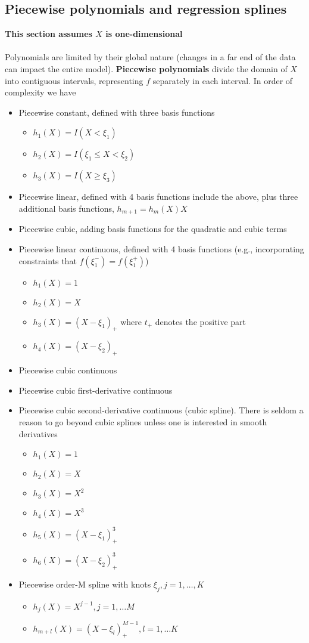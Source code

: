\documentclass{article}
\begin{document}
\subsection{Piecewise polynomials and regression splines}
\textbf{This section assumes $X$ is one-dimensional}\\\\
Polynomials are limited by their global nature (changes in a far end of the data can impact the entire model). \textbf{Piecewise polynomials} divide the domain of $X$ into contiguous intervals, representing $f$ separately in each interval. In order of complexity we have
\begin{itemize}
  \item Piecewise constant, defined with three basis functions
  \begin{itemize}
    \item $h_1(X) = I(X < \xi_1)$
    \item $h_2(X) = I(\xi_1 \leq X < \xi_2)$
    \item $h_3(X) = I(X \geq \xi_3)$
  \end{itemize}
  \item Piecewise linear, defined with 4 basis functions include the above, plus three additional basis functions, $h_{m+1} = h_m(X)X$
  \item Piecewise cubic, adding basis functions for the quadratic and cubic terms
  \item Piecewise linear continuous, defined with 4 basis functions (e.g., incorporating constraints that $f(\xi_1^-) = f(\xi_1^+)$)
  \begin{itemize}
    \item $h_1(X) = 1$
    \item $h_2(X) = X$
    \item $h_3(X) = (X - \xi_1)_+$ where $t_+$ denotes the positive part
    \item $h_4(X) = (X - \xi_2)_+$
  \end{itemize}
  \item Piecewise cubic continuous
  \item Piecewise cubic first-derivative continuous
  \item Piecewise cubic second-derivative continuous (cubic spline). There is seldom a reason to go beyond cubic splines unless one is interested in smooth derivatives
  \begin{itemize}
    \item $h_1(X) = 1$
    \item $h_2(X) = X$
    \item $h_3(X) = X^2$
    \item $h_4(X) = X^3$
    \item $h_5(X) = (X - \xi_1)^3_+$
    \item $h_6(X) = (X - \xi_2)^3_+$
  \end{itemize}
  \item Piecewise order-M spline with knots $\xi_j, j=1, \dots, K$
  \begin{itemize}
    \item $h_j(X) = X^{j-1}, j=1, \dots M$
    \item $h_{m+l}(X) = (X - \xi_l)^{M-1}_+, l=1, \dots K$
  \end{itemize}
\end{itemize}
\end{document}

